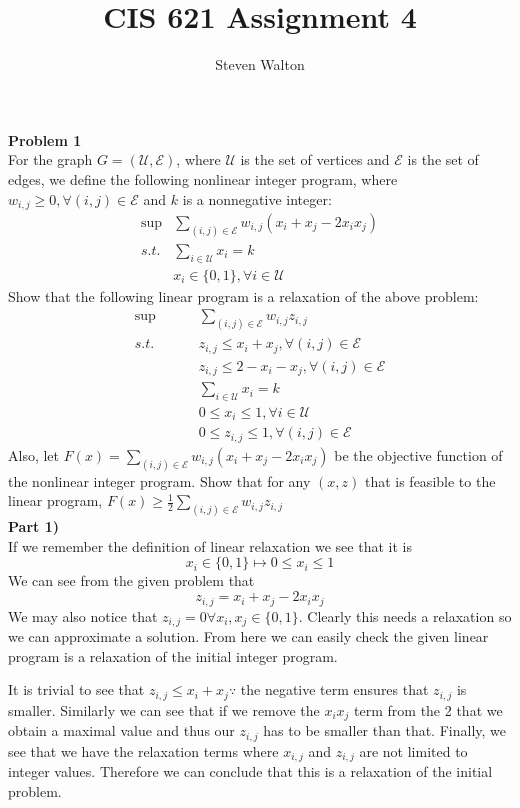 \documentclass[12pt,letter]{article}
\newcommand{\problem}[1]{\vspace{3mm}\Large\textbf{{Problem {#1}\vspace{3mm}}}\normalsize\\}
\newcommand{\ppart}[1]{\vspace{2mm}\large\textbf{\\Part {#1})\vspace{2mm}}\normalsize\\}
\begin{document}
\title{CIS 621 Assignment 4}
\author{Steven Walton}
\maketitle
\problem{1}
For the graph $G=(\mathcal{U},\mathcal{E})$, where $\mathcal{U}$ is the set of 
vertices and $\mathcal{E}$ is the set of edges, we define the following
nonlinear integer program, where $w_{i,j}\geq0, \forall(i,j)\in\mathcal{E}$ and 
$k$ is a nonnegative integer:
\begin{align*}
    \sup&\sum\limits_{(i,j)\in\mathcal{E}} w_{i,j}(x_i + x_j - 2x_ix_j)\\
    s.t. & \sum\limits_{i\in\mathcal{U}}x_i = k\\
       & x_i\in\{0,1\}, \forall i \in\mathcal{U}
\end{align*}
Show that the following linear program is a relaxation of the above problem:
\begin{align*}
    \sup&\sum\limits_{(i,j)\in\mathcal{E}} w_{i,j}z_{i,j}\\
     s.t.\hspace{1cm} & z_{i,j}\leq x_i + x_j, \forall(i,j)\in\mathcal{E}\\
     & z_{i,j}\leq 2 - x_i - x_j, \forall(i,j) \in \mathcal{E}\\
     & \sum\limits_{i\in\mathcal{U}}x_i = k\\
     & 0 \leq x_i \leq 1, \forall i \in\mathcal{U}\\
     & 0 \leq z_{i,j} \leq 1, \forall(i,j)\in\mathcal{E}
\end{align*}
Also, let $F(x)=\sum\limits_{(i,j)\in\mathcal{E}}w_{i,j}(x_i + x_j - 2x_ix_j)$ be
the objective function of the nonlinear integer program. Show that for any 
$(x,z)$ that is feasible to the linear program, 
$F(x)\geq\frac12\sum\limits_{(i,j)\in\mathcal{E}}w_{i,j}z_{i,j}$
\ppart{1}
If we remember the definition of linear relaxation we see that it is
\[
    x_i\in\{0,1\} \mapsto 0\leq x_i \leq 1
\]
We can see from the given problem that 
\[
    z_{i,j} = x_i + x_j - 2x_ix_j
\]
We may also notice that $z_{i,j} = 0 \forall x_i,x_j\in\{0,1\}$. Clearly this 
needs a relaxation so we can approximate a solution. From here we can easily 
check the given linear program is a relaxation of the initial integer program.

It is trivial to see that $z_{i,j}\leq x_i + x_j \because$ the negative term
ensures that $z_{i,j}$ is smaller. Similarly we can see that if we remove the 
$x_ix_j$ term from the 2 that we obtain a maximal value and thus our $z_{i,j}$
has to be smaller than that. Finally, we see that we have the relaxation terms
where $x_{i,j}$ and $z_{i,j}$ are not limited to integer values. Therefore we
can conclude that this is a relaxation of the initial problem.
\end{document}
